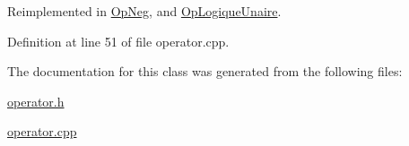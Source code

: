 Reimplemented in \hyperlink{class_op_neg_aba05bfb2ea8d1061303c2f98201b42c1}{Op\+Neg}, and \hyperlink{class_op_logique_unaire_a823d44ca7bb4caf3b9b34e3ff263001b}{Op\+Logique\+Unaire}.



Definition at line 51 of file operator.\+cpp.



The documentation for this class was generated from the following files\+:\begin{DoxyCompactItemize}
\item 
\hyperlink{operator_8h}{operator.\+h}\item 
\hyperlink{operator_8cpp}{operator.\+cpp}\end{DoxyCompactItemize}
